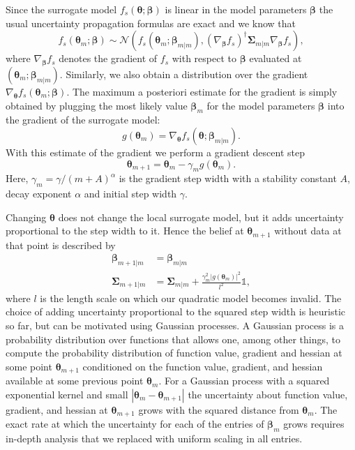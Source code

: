 \documentclass[aps,prb,twoside,superscriptaddress,longbibliography,nofootinbib,floatfix, notitlepage,twocolumn]{revtex4-1}
\renewcommand{\vec}[1]{\boldsymbol{#1}}
\begin{document}
Since the surrogate model $f_s(\vec\theta; \vec\beta)$ is linear in the model parameters
$\vec\beta$ the usual uncertainty propagation formulas are exact and we know that
\begin{equation}
  f_s(\vec\theta_m; \vec\beta) \sim \mathcal{N}
  \left(
    f_s(\vec\theta_m; \vec\beta_{m|m}), (\nabla_{\vec\beta} f_s)^\dagger \vec\Sigma_{m|m} \nabla_{\vec\beta} f_s
  \right),
\end{equation}
where $\nabla_{\vec\beta} f_s$ denotes the gradient of $f_s$ with respect to $\vec\beta$
evaluated at $(\vec\theta_m; \vec\beta_{m|m})$. Similarly, we also obtain a distribution
over the gradient $\nabla_{\vec\theta} f_s(\vec\theta_m; \vec\beta)$. 
The maximum a posteriori estimate for the gradient is simply obtained by plugging 
the most likely value $\vec\beta_{m}$ for the model parameters $\vec\beta$ 
into the gradient of the surrogate model:
\begin{equation}
  g(\vec\theta_m) = \nabla_{\vec\theta} f_s(\vec\theta; \vec\beta_{m|m}).
\end{equation}
With this estimate of the gradient we perform a gradient descent step 
\begin{equation}
  \vec\theta_{m+1} = \vec\theta_m - \gamma_m g(\vec\theta_m).
\end{equation}
Here, $\gamma_m = \gamma / (m + A)^\alpha$ is the gradient step
width with a stability constant $A$, decay exponent $\alpha$ and initial step width
$\gamma$.

Changing $\vec\theta$ does not change the local surrogate model, but it adds uncertainty proportional to the step width to it. Hence the belief at $\vec\theta_{m+1}$ without
data at that point is described by
\begin{equation}
\begin{aligned}
  \vec\beta_{m+1|m} &= \vec\beta_{m|m}  \\
  \vec\Sigma_{m+1|m} &= \vec\Sigma_{m|m} + \frac{\gamma_m^2 |g(\vec\theta_m)|^2}{l^2} \mathds{1},
\end{aligned}
\end{equation}
where $l$ is the length scale on which our
quadratic model becomes invalid.  The choice of adding uncertainty proportional
to the squared step width is heuristic so far, but can be motivated using
Gaussian processes.
A Gaussian process is a probability distribution over functions that allows one, among other things, to compute the probability distribution of function
value, gradient and hessian at some point $\vec\theta_{m+1}$ conditioned
on the function value, gradient, and hessian available at some previous
point $\vec\theta_m$.  For a Gaussian process with a squared exponential kernel and
small $|\vec\theta_m - \vec\theta_{m+1}|$ the uncertainty about function value, gradient,
and hessian at $\vec\theta_{m+1}$ grows with the squared distance from $\vec\theta_m$.
The exact rate at which the uncertainty for each of the entries of $\vec\beta_m$ 
grows requires in-depth analysis that we replaced with uniform scaling in all
entries.
\end{document}
